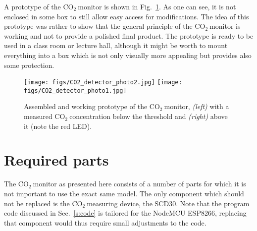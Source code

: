 \documentclass[12pt,a4paper]{article}
\newcommand{\coo}{\ensuremath{\mathrm{CO_2}~}}
\begin{document}
A prototype of the \coo monitor is shown in Fig.~\ref{f:CO2_monitor_photo}. As one can see, it is not enclosed in some box to still allow easy access for modifications. The idea of this prototype was rather to show that the general principle of the \coo monitor is working and not to provide a polished final product. The prototype is ready to be used in a class room or lecture hall, although it might be worth to mount everything into a box which is not only visually more appealing but provides also some protection.
\begin{figure}[ht]
\center
\texttt{[image: figs/CO2\_detector\_photo2.jpg]}
\hspace{1em}
\texttt{[image: figs/CO2\_detector\_photo1.jpg]}
\caption{Assembled and working prototype of the \coo monitor, \textit{(left)} with a measured \coo concentration below the threshold and \textit{(right)} above it (note the red LED).}
\label{f:CO2_monitor_photo}
\end{figure}


\section{Required parts}
The \coo monitor as presented here consists of a number of parts for which it is not important to use the exact same model. The only component which should not be replaced is the \coo measuring device, the SCD30. Note that the program code discussed in Sec.~\ref{s:code} is tailored for the NodeMCU ESP8266, replacing that component would thus require small adjustments to the code. 
\end{document}
